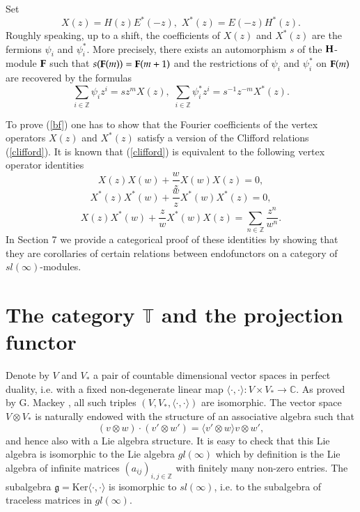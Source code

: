 \documentclass[11pt]{amsart}
\renewcommand{\gg}{\mathfrak{g}}
\newcommand{\Ker}{\mathrm{Ker}}
\begin{document}
Set 
\begin{equation}\label{eqvert}
X(z)=H(z)E^*(-z),\,\,X^*(z)=E(-z)H^*(z).
\end{equation}
Roughly speaking, up to a shift, the coefficients of $X(z)$ and $X^*(z)$ are the
fermions $\psi_i$ and $\psi_i^*$.
More precisely, 
there exists  an automorphism $s$ of the $\bold {H}$-module $\bold{F}$ such that 
$s(\bold{F}(m))= \bold{F}(m+1)$ and the restrictions of $\psi_i$ and $\psi_i^*$ on
$\bold{F}(m)$ are recovered by the formulas
\begin{equation}\label{bf}
\sum_{i\in\mathbb Z}\psi_iz^i=sz^{m}X(z),\,\, \sum_{i\in\mathbb Z}\psi^*_iz^i=s^{-1}z^{-m}X^*(z).
\end{equation}

To prove (\ref{bf}) one has to show that the Fourier coefficients of the vertex operators
$X(z)$ and $X^*(z)$ satisfy a version of the Clifford relations  (\ref{clifford}). It is known \cite{F}
that (\ref{clifford}) is equivalent to the following vertex operator identities
\begin{equation}\label{v1}
X(z)X(w)+\frac{w}{z} X(w)X(z)=0,
\end{equation}
\begin{equation}\label{v2}
X^*(z)X^*(w)+\frac{w}{z} X^*(w)X^*(z)=0,
\end{equation}
\begin{equation}\label{v3}
X(z)X^*(w)+\frac{z}{w}X^*(w)X(z)=\sum_{n\in\mathbb Z}\frac{z^n}{w^n}.
\end{equation}
In Section 7 we provide a categorical proof of these identities by showing
that they are corollaries of certain relations between endofunctors on a category
of $sl(\infty)$-modules.

\section{The category $\mathbb T$ and the projection functor}


Denote by $V$ and $V_*$ a pair of countable dimensional vector spaces
in perfect duality, i.e. with a fixed non-degenerate linear map $\langle\cdot,\cdot\rangle : V\times V_*\to\mathbb C$.
As proved by G. Mackey \cite{Mk}, all such triples $(V,V_*,\langle\cdot,\cdot\rangle)$ are
isomorphic. The vector space $V\otimes V_*$ is naturally endowed with
the structure of an
associative algebra such that $$(v\otimes w)\cdot (v'\otimes w')=\langle v'\otimes w\rangle v\otimes w',$$ and hence also with a Lie algebra structure.
It is easy to check that this Lie algebra is isomorphic to the Lie algebra
$gl(\infty)$ which by definition is the Lie algebra of
infinite matrices $(a_{ij})_{i,j\in\mathbb Z}$ with finitely many non-zero entries. The subalgebra $\gg=\Ker \langle\cdot,\cdot\rangle$ is isomorphic to
$sl(\infty)$, i.e. to the subalgebra of traceless matrices
in  $gl(\infty)$. 
\end{document}
